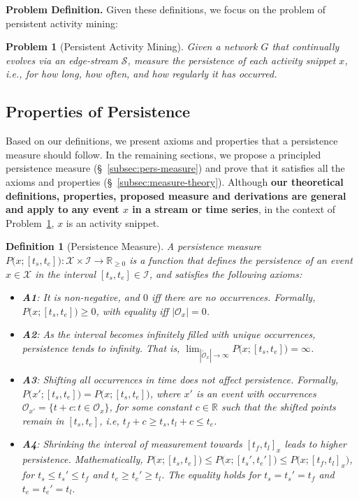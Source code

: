 \documentclass[sigconf]{acmart}
\newtheorem{problem}{Problem}
\newtheorem{definition}{Definition}
\newcommand{\graph}{G}
\newcommand{\stream}{\mathscr{S}}
\newcommand{\pattern}{x}
\newcommand{\x}{x}
\newcommand{\xUniverse}{\mathcal{X}}
\newcommand{\intervalStart}{t_s}
\newcommand{\intervalEnd}{t_e}
\newcommand{\interval}{[\intervalStart, \intervalEnd]}
\newcommand{\intervalUniverse}{\mathcal{I}}
\newcommand{\occ}{t}
\newcommand{\occs}{\mathcal{O}}
\newcommand{\uniqueOccs}{\tilde{\occs}}
\newcommand{\firstOcc}{t_f}
\newcommand{\lastOcc}{t_l}
\newcommand{\occInterval}{[\firstOcc,\lastOcc]}
\newcommand{\occIntervalsmall}{[t_s',t_e']}
\newcommand{\persistence}{P}
\newcommand{\persistenceLong}{P\big(x;[\intervalStart,\intervalEnd]\big)}
\newcommand{\axiomOne}{\textbf{A1}}
\newcommand{\axiomTwo}{\textbf{A2}}
\newcommand{\axiomThree}{\textbf{A3}}
\newcommand{\axiomFour}{\textbf{A4}}
\begin{document}
\vspace{0.1cm}
\noindent \textbf{Problem Definition.} Given these definitions, we focus on the problem of persistent activity mining:
\begin{problem}[Persistent Activity Mining]\label{problem:prob1}
Given a network $\graph$ that continually evolves via an edge-stream $\stream$, measure the persistence of each activity snippet $\pattern$, i.e., for how long, how often, and how regularly it has occurred.
\end{problem}

\subsection{Properties of Persistence}
\label{subsec:pers-theory}
Based on our definitions, we present axioms and properties that a persistence measure should follow. 
In the remaining sections, we propose a principled persistence measure (\S~\ref{subsec:pers-measure}) and prove that it satisfies all the axioms and properties (\S~\ref{subsec:measure-theory}). 
Although \textbf{our theoretical definitions, properties, proposed measure and derivations are general and apply to any event $\x$ in a stream or time series}, in the context of Problem~\ref{problem:prob1}, $\x$ is an activity snippet.

\begin{definition}[Persistence Measure]
\label{def:persistence-measure}
A persistence measure $\persistenceLong : \xUniverse \times \intervalUniverse \rightarrow \mathbb{R}_{\geq 0}$
is a function that defines 
the persistence of an event $x \in \xUniverse$ in the interval $\interval \in \intervalUniverse$, and 
satisfies the following axioms:
\begin{itemize}[leftmargin=*]
    \item \axiomOne: It is non-negative, and $0$ iff there are no occurrences. Formally, $\persistenceLong \geq 0$, with equality iff $|\occs_\x| = 0$.
    \item \axiomTwo: As the interval becomes infinitely filled with unique occurrences, persistence tends to infinity.
    That is, $\lim_{|\uniqueOccs_\x| \rightarrow \infty} \persistenceLong = \infty$.
    \item \axiomThree: Shifting all occurrences in time does not affect persistence.
        Formally, $\persistence\big(\x';\interval\big) = \persistenceLong$, where $\x'$ is an event with occurrences $\occs_{\x'} = \{\occ + c : \occ \in \occs_x\}$, for some constant $c\in\mathbb{R}$ such that the shifted points remain in $\interval$, i.e, $\firstOcc + c \geq \intervalStart, \lastOcc + c \leq \intervalEnd$.
     \item \axiomFour: Shrinking the interval of measurement towards $\occInterval_\x$ leads to higher persistence. 
         Mathematically, $\persistenceLong \leq \persistence\big(x; \occIntervalsmall \big) \leq \persistence\big(x; \occInterval_\x\big)$, 
         for $t_s \leq t_s' \leq t_f$ and $t_e \geq t_e' \geq t_l$. The equality holds for $t_s = t_s' = t_f$ and $t_e = t_e' = t_l$.
         
\end{itemize}
\end{definition}
\end{document}
